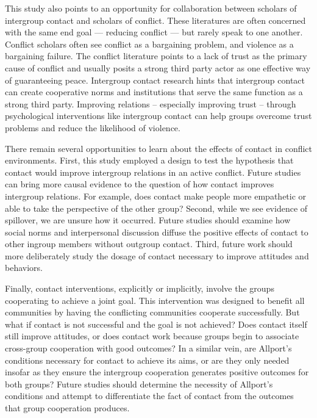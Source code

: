 \documentclass[11pt]{article}
\begin{document}
This study also points to an opportunity for collaboration between
scholars of intergroup contact and scholars of conflict. These
literatures are often concerned with the same end goal --- reducing
conflict --- but rarely speak to one another. Conflict scholars often
see conflict as a bargaining problem, and violence as a bargaining
failure. The conflict literature points to a lack of trust as the
primary cause of conflict and usually posits a strong third party actor
as one effective way of guaranteeing peace. Intergroup contact research
hints that intergroup contact can create cooperative norms and
institutions that serve the same function as a strong third party.
Improving relations -- especially improving trust -- through
psychological interventions like intergroup contact can help groups
overcome trust problems and reduce the likelihood of violence.

There remain several opportunities to learn about the effects of contact
in conflict environments. First, this study employed a design to test
the hypothesis that contact would improve intergroup relations in an
active conflict. Future studies can bring more causal evidence to the
question of how contact improves intergroup relations. For example, does
contact make people more empathetic or able to take the perspective of
the other group? Second, while we see evidence of spillover, we are
unsure how it occurred. Future studies should examine how social norms
and interpersonal discussion diffuse the positive effects of contact to
other ingroup members without outgroup contact. Third, future work
should more deliberately study the dosage of contact necessary to
improve attitudes and behaviors.

Finally, contact interventions, explicitly or implicitly, involve the
groups cooperating to achieve a joint goal. This intervention was
designed to benefit all communities by having the conflicting
communities cooperate successfully. But what if contact is not
successful and the goal is not achieved? Does contact itself still
improve attitudes, or does contact work because groups begin to
associate cross-group cooperation with good outcomes? In a similar vein,
are Allport's conditions necessary for contact to achieve its aims, or
are they only needed insofar as they ensure the intergroup cooperation
generates positive outcomes for both groups? Future studies should
determine the necessity of Allport's conditions and attempt to
differentiate the fact of contact from the outcomes that group
cooperation produces.
\end{document}
